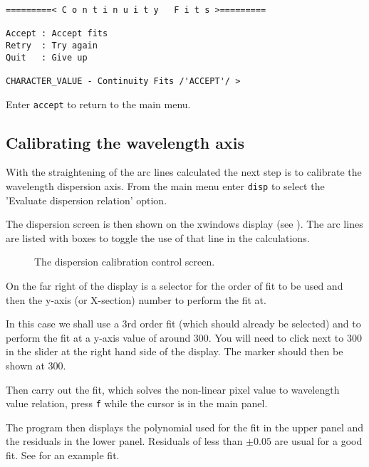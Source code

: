 {\scspec{\small}{ }
\begin{verbatim}
=========< C o n t i n u i t y   F i t s >=========

Accept : Accept fits
Retry  : Try again
Quit   : Give up

CHARACTER_VALUE - Continuity Fits /'ACCEPT'/ > 
\end{verbatim}
}

Enter {\tt accept} to return to the main menu.

\subsection{Calibrating the wavelength axis}


With the straightening of the arc lines calculated the next step is to
calibrate the wavelength dispersion axis. From the main menu enter {\tt disp} to select the 'Evaluate dispersion relation' option.

The dispersion screen is then shown on the xwindows display (see ). The arc lines are listed with boxes to toggle the use of that line in the calculations.

\begin{figure}
\begin{center}
{\leavevmode\epsfysize=136mm}

\parbox{140mm}{
\caption{The dispersion calibration control screen.}
\label{dispdisplay}
}
\end{center}
\end{figure}


On the far right of the display is a selector for the order of fit to be used 
and then the y-axis (or X-section) number to perform the fit at.

In this case we shall use a 3rd order fit (which should already be selected) and to perform the fit at a y-axis value of around 300. You will need to click next to 300 in the slider at the right hand side of the display. The marker should then be shown at 300.

Then carry out the fit, which solves the non-linear pixel value to wavelength value relation, press {\tt f} while the cursor is in the main panel.

The program then displays the polynomial used for the fit in the upper panel and the residuals in the lower panel. Residuals of less than $\pm0.05$ are usual for a good fit. See  for an example fit.



